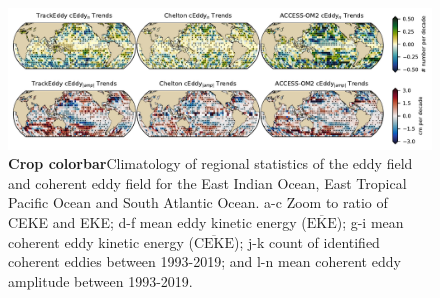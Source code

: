\documentclass[draft]{agujournal2019}
\newcommand{\MEKE}{\overline{\textrm{EKE}}}
\newcommand{\MCEKE}{\overline{\textrm{CEKE}}}
\begin{document}
	\begin{figure}
	    \centering
	    \includegraphics[width=1\textwidth]{figures/all_trackeddy_trends.pdf}
	    \caption{\textbf{Crop colorbar}Climatology of regional statistics of the eddy field and coherent eddy field for the East Indian Ocean, East Tropical Pacific Ocean and South Atlantic Ocean. a-c Zoom to ratio of CEKE and EKE; d-f  mean eddy kinetic energy ($\MEKE$); g-i mean coherent eddy kinetic energy ($\MCEKE$); j-k count of identified coherent eddies between 1993-2019; and l-n mean coherent eddy amplitude between 1993-2019.}
	    \label{fig:my_label}
	\end{figure}

	
	

	
\end{document}
